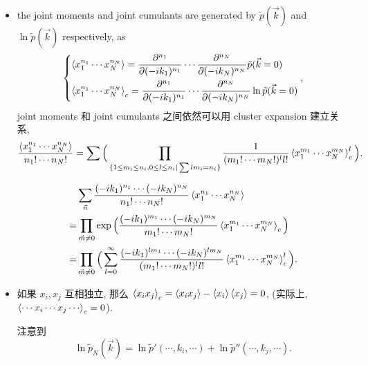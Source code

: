 \begin{itemize}
	\item the joint moments and joint cumulants are generated by $\tilde{p}(\vec{k})$ and $\ln \tilde{p}(\vec{k})$ respectively, as
	\begin{equation}
		\begin{dcases}
			\braket{x_1^{n_1} \cdots x_N^{n_N}} = \frac{\partial^{n_1}}{\partial (- i k_1)^{n_1}} \cdots \frac{\partial^{n_N}}{\partial (- i k_N)^{n_N}} \tilde{p}(\vec{k} = 0) \\
			\braket{x_1^{n_1} \cdots x_N^{n_N}}_c = \frac{\partial^{n_1}}{\partial (- i k_1)^{n_1}} \cdots \frac{\partial^{n_N}}{\partial (- i k_N)^{n_N}} \ln \tilde{p}(\vec{k} = 0)
		\end{dcases},
	\end{equation}
	joint moments 和 joint cumulants 之间依然可以用 cluster expansion 建立关系,
	\begin{equation}
		\frac{\braket{x_1^{n_1} \cdots x_N^{n_N}}}{n_1! \cdots n_N!} = \sum \Big( \prod_{\{1 \leq m_i \leq n_i, 0 \leq l \leq n_i | \sum l m_i = n_i\}} \frac{1}{(m_1! \cdots m_N!)^l l!} \braket{x_1^{m_1} \cdots x_N^{m_N}}_c^l \Big).
	\end{equation}
	
	\begin{tcolorbox}[title=calculation:]
		\begin{align}
			& \sum_{\vec{n}} \frac{(- i k_1)^{n_1} \cdots (- i k_N)^{n_N}}{n_1! \cdots n_N!} \braket{x_1^{n_1} \cdots x_N^{n_N}} \notag \\
			=& \prod_{\vec{m} \neq 0} \exp \Big( \frac{(- i k_1)^{m_1} \cdots (- i k_N)^{m_N}}{m_1! \cdots m_N!} \braket{x_1^{m_1} \cdots x_N^{m_N}}_c \Big) \notag \\
			=& \prod_{\vec{m} \neq 0} \Big( \sum_{l = 0}^\infty \frac{(- i k_1)^{l m_1} \cdots (- i k_N)^{l m_N}}{(m_1! \cdots m_N!)^l l!} \braket{x_1^{m_1} \cdots x_N^{m_N}}_c^l \Big).
		\end{align}
	\end{tcolorbox}
	
	\item 如果 $x_i, x_j$ 互相独立, 那么 $\braket{x_i x_j}_c = \braket{x_i x_j} - \braket{x_i} \braket{x_j} = 0$, (实际上, $\braket{\cdots x_i \cdots x_j \cdots}_c = 0$).
	
	\begin{tcolorbox}[title=calculation:]
		注意到
		\begin{equation}
			\ln \tilde{p}_N(\vec{k}) = \ln \tilde{p}'(\cdots, k_i, \cdots) + \ln \tilde{p}''(\cdots, k_j, \cdots).
		\end{equation}
	\end{tcolorbox}
	

\end{itemize}
